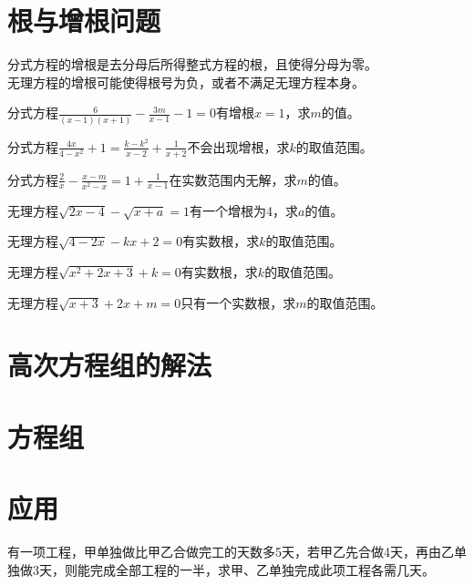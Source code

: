 \documentclass{ecnuthesis}
\begin{document}
\section{根与增根问题}
\begin{knowledge}
    分式方程的增根是去分母后所得整式方程的根，且使得分母为零。\\
    无理方程的增根可能使得根号为负，或者不满足无理方程本身。
\end{knowledge}
\begin{problem}
    分式方程$\frac{6}{(x-1)(x+1)}-\frac{3m}{x-1}-1=0$有增根$x=1$，求$m$的值。\\
\end{problem}
\begin{problem}
    分式方程$\frac{4x}{4-x^2}+1=\frac{k-k^2}{x-2}+\frac{1}{x+2}$不会出现增根，求$k$的取值范围。 \\
\end{problem}
\begin{problem}
    分式方程$\frac{2}{x}-\frac{x-m}{x^2-x}=1+\frac{1}{x-1}$在实数范围内无解，求$m$的值。\\
\end{problem}
\begin{problem}
    无理方程$\sqrt{2x-4}-\sqrt{x+a}=1$有一个增根为4，求$a$的值。\\
\end{problem}
\begin{problem}
    无理方程$\sqrt{4-2x}-kx+2=0$有实数根，求$k$的取值范围。\\
\end{problem}
\begin{problem}
    无理方程$\sqrt{x^2+2x+3}+k=0$有实数根，求$k$的取值范围。\\
\end{problem}
\begin{problem}
    无理方程$\sqrt{x+3}+2x+m=0$只有一个实数根，求$m$的取值范围。\\
\end{problem}
\clearpage
\section{高次方程组的解法}
\clearpage
\section{方程组}
\clearpage
\section{应用}
\begin{problem}
    有一项工程，甲单独做比甲乙合做完工的天数多5天，若甲乙先合做4天，再由乙单独做3天，则能完成全部工程的一半，求甲、乙单独完成此项工程各需几天。
\end{problem}
\clearpage
\end{document}
